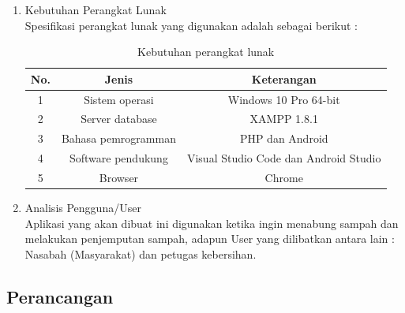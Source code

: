 \begin{itemize}
\begin{enumerate}
		\item Kebutuhan Perangkat Lunak
		\hfill\\
		Spesifikasi perangkat lunak yang digunakan adalah sebagai berikut :
\begin{table}[H]
\caption{Kebutuhan perangkat lunak}
\centering
\begin{tabular}{c c c}
\hline \hline
No. & Jenis & Keterangan \\ [0.5ex]
\hline
1 & Sistem operasi & Windows 10 Pro 64-bit \\
2 & Server database & XAMPP 1.8.1 \\
3 & Bahasa pemrogramman & PHP dan Android \\
4 & Software pendukung & Visual Studio Code dan Android Studio \\ 
5 & Browser & Chrome \\ [1ex]
\hline
\end{tabular}
\label{tabel:nonlin}
\end{table}
		
		\item Analisis Pengguna/User
		\hfill\\
		Aplikasi yang akan dibuat ini digunakan ketika ingin menabung sampah dan melakukan penjemputan sampah, adapun User yang dilibatkan antara lain : Nasabah (Masyarakat) dan petugas kebersihan.
	\end{enumerate}
\end{itemize}

\subsection{Perancangan}
